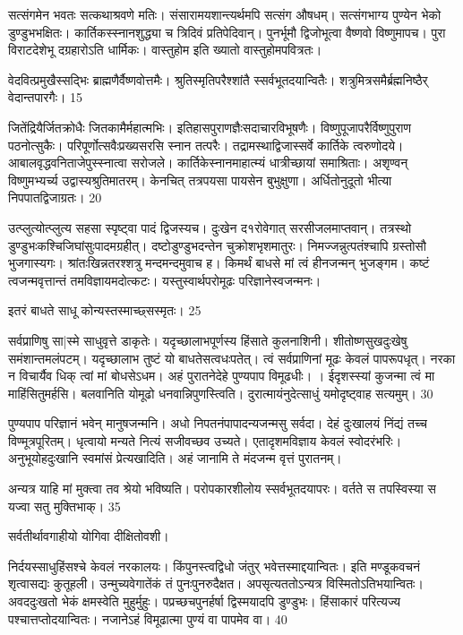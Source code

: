 सत्संगमेन भवतः सत्कथाश्रवणे मतिः।
संसारामयशान्त्यर्थमपि सत्संग औषधम्।
सत्संगभाग्य पुण्येन भेको डुण्डुभभक्षितः।
कार्तिकस्स्नानशुद्ध्या च त्रिदिवं प्रतिपेदिवान्।
पुनर्भूमौ द्विजोभूत्वा वैष्णवो विष्णुमापच।
पुरा विराटदेशेभू दग्रहारोऽति धार्मिकः।
वास्तुहोम इति ख्यातो वास्तुहोमपवित्रतः।

वेदवित्प्रमुखैस्सद्भिः ब्राह्मणैर्वैष्णवोत्तमैः।
श्रुतिस्मृतिपरैश्शांतै स्सर्वभूतदयान्वितैः।
शत्रुमित्रसमैर्ब्रह्मनिष्ठैर् वेदान्तपारगैः।
15

जितेंद्रियैर्जितक्रोधैः जितकामैर्महात्मभिः।
इतिहासपुराणज्ञैःसदाचारविभूषणैः।
विष्णुपूजापरैर्विष्णुपुराण पठनोत्सुकैः।
परिपूर्णोत्सवैःप्रख्यसरसि स्नान तत्परैः।
तद्रामस्थाद्विजास्सर्वे कार्तिके त्वरुणोदये।
आबालवृद्धवनिताजेपुस्स्नात्वा सरोजले।
कार्तिकेस्नानमाहात्म्यं धात्रीच्छायां समाश्रिताः।
अशृण्वन् विष्णुमभ्यर्च्य उद्वास्यश्रुतिमातरम्।
केनचित् तत्रपयसा पायसेन बुभुक्षुणा।
अर्धितोनुदूतो भीत्या निपपातद्विजाग्रतः।
20

उत्प्लुत्योत्प्लुत्य सहसा स्पृष्ट्वा पादं द्विजस्यच।
दुःखेन द१रोवेगात् सरसीजलमाप्तवान्।
तत्रस्थो डुण्डुभःकश्चिजिघांसुःपादमग्रहीत्।
दष्टोडुण्डुभदन्तेन चुक्रोशभृशमातुरः।
निमज्जन्नुत्पतंश्चापि ग्रस्तोसौ भुजगास्यगः।
श्रांतःखिन्नतरश्शत्रु मन्दमन्दमुवाच ह।
किमर्थं बाधसे मां त्वं हीनजन्मन् भुजङ्गम।
कष्टं त्वजन्मवृत्तान्तं तमविज्ञायमदोत्कटः।
यस्तुस्वार्थपरोमूढः परिज्ञानेस्वजन्मनः।

इतरं बाधते साधू कोन्यस्तस्माच्छ्सस्मृतः।
25

सर्वप्राणिषु सा|स्मे साधुवृत्ते डाकृतेः।
यदृच्छालाभपूर्णस्य हिंसाते कुलनाशिनी।
शीतोष्णसुखदुःखेषु समंशान्तमलंपटम्।
यदृच्छालाभ तुष्टं यो बाधतेसत्वधःपतेत्।
त्वं सर्वप्राणिनां मूढः केवलं पापरूपधृत्।
नरका न विचार्यैव धिक् त्वां मां बोधसेऽधम।
अहं पुरातनेदेहे पुण्यपाप विमूढधीः।
।
ईदृशस्स्यां कुजन्मा त्वं मा माहिंसितुमर्हसि।
बलवानिति योमूढो धनवान्निपुणस्त्विति।
दुरात्मायंनुदेत्साधुं यमोदृष्ट्वाह सत्यमुम्।
30

पुण्यपाप परिज्ञानं भवेन् मानुषजन्मनि।
अधो निपतनंपापादन्यजन्मसु सर्वदा।
देहं दुःखालयं निंद्यं तच्च विण्मूत्रपूरितम्।
धृत्वायो मन्यते नित्यं सजीवच्छव उच्यते।
एतादृशमविज्ञाय केवलं स्वोदरंभरिः।
अनुभूयोहदुःखानि स्वमांसं प्रेत्यखादिति।
अहं जानामि ते मंदजन्म वृत्तं पुरातनम्।

अन्यत्र याहि मां मुक्त्वा तव श्रेयो भविष्यति।
परोपकारशीलोय स्सर्वभूतदयापरः।
वर्तते स तपस्विस्या स यज्वा सतु मुक्तिभाक्।
35

सर्वतीर्थावगाहीयो योगिवा दीक्षितोवशी।

निर्दयस्साधुहिंसश्चे केवलं नरकालयः।
किंपुनस्त्वद्विधो जंतुर् भवेत्तस्माद्दयान्वितः।
इति मण्डूकवचनं शृत्वासद्यः कुतूहली।
उन्मुच्यवेगातेंकं तं पुनःपुनरुदैक्षत।
अपसृत्यततोऽन्यत्र विस्मितोऽतिभयान्वितः।
अवददुःखतो भेकं क्षमस्वेति मुहुर्मुहुः।
पप्रच्छचपुनर्हर्षा द्विस्मयादपि डुण्डुभः।
हिंसाकारं परित्यज्य पश्चात्तप्तोदयान्वितः।
नजानेऽहं विमूढात्मा पुण्यं वा पापमेव वा।
40

